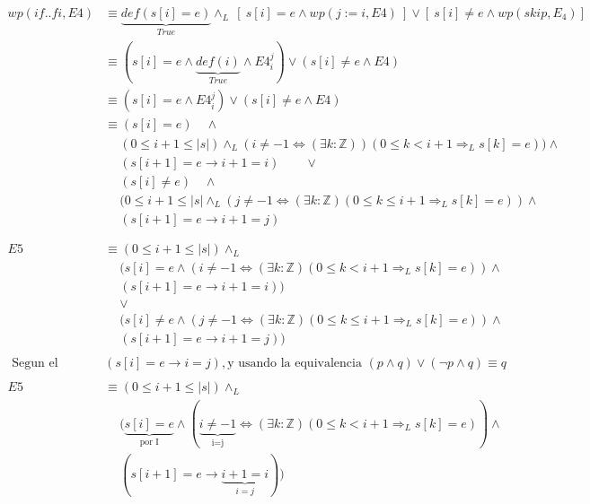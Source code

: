 \documentclass[12pt]{book}
\begin{document}
\begin{align*}
wp( if..fi,  E4 ) &\equiv \underbrace{ def(s[i] = e )}_{True} \land_L 
 \ \left[ \ s[i] = e \land wp(j := i, E4)  \ \right] \lor \left[ \ s[i] \neq e \land wp(skip, E_4)\right] \\
&\equiv (s[i] = e \land \underbrace{ def(i)}_{True} \land {E4}^j_i) \lor (s[i] \neq e \land E4) \\
&\equiv (s[i] = e \land  {E4}^j_i) \lor (s[i] \neq e \land E4) \\
&\equiv  (s[i] = e ) \quad \land  \\ 
& \quad \ (0\leq i +1 \leq|s|) \land_L ( i \neq -1 \Leftrightarrow (\exists k: \mathbb{Z})) ( 0 \leq k < i + 1 \Rightarrow_L s[k] = e))\wedge \\
& \quad \  (s[i+1] = e \rightarrow i+1 = i) \qquad \lor \\ 
& \quad \ (s[i] \neq e) \quad  \land \\
& \quad \ (0\leq i +1 \leq|s| \land_L ( j\neq -1 \Leftrightarrow (\exists k: \mathbb{Z}) ( 0 \leq k \leq i + 1 \Rightarrow_L s[k] = e))\wedge \\
& \quad \  (s[i+1] = e \rightarrow i+1 = j) \\ \\ \\
E5 &\equiv ( 0\leq i +1 \leq|s|) \land_L  \\
& \quad \ (s[i] = e \land (i\neq -1 \Leftrightarrow (\exists k: \mathbb{Z}) ( 0 \leq k < i + 1 \Rightarrow_L s[k] = e)) \wedge \\
& \quad \  (s[i+1] = e \rightarrow i+1 = i))\\
& \quad \ \lor \\  
& \quad \ (s[i] \neq e \land ( j\neq -1 \Leftrightarrow (\exists k: \mathbb{Z}) ( 0 \leq k \leq i + 1 \Rightarrow_L s[k] = e)) \wedge \\
& \quad \  (s[i+1] = e \rightarrow i+1 = j) ) \\ \\
\text{ Segun el invariante } & (s[i] = e \rightarrow i = j), \text{y usando la equivalencia }(p \wedge q )\vee(\neg p \wedge q )\equiv q \\ \\
E5 &\equiv ( 0\leq i +1 \leq|s|) \land_L  \\
& \quad \ ( \underbrace{ s[i] = e }_{\text{por I}}\land (\underbrace{ i \neq -1}_{\text{i=j}} \Leftrightarrow (\exists k: \mathbb{Z}) ( 0 \leq k < i + 1 \Rightarrow_L s[k] = e)) \wedge \\
& \quad \  (s[i+1] = e \rightarrow \underbrace{ i+1 = i }_{i=j}) )\\

\end{align*}
\end{document}
